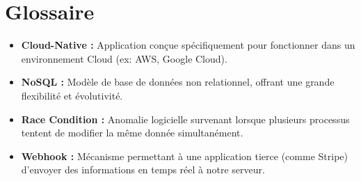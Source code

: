 \chapter*{Glossaire}
\begin{itemize}
    \item \textbf{Cloud-Native :} Application conçue spécifiquement pour fonctionner dans un environnement Cloud (ex: AWS, Google Cloud).
    \item \textbf{NoSQL :} Modèle de base de données non relationnel, offrant une grande flexibilité et évolutivité.
    \item \textbf{Race Condition :} Anomalie logicielle survenant lorsque plusieurs processus tentent de modifier la même donnée simultanément.
    \item \textbf{Webhook :} Mécanisme permettant à une application tierce (comme Stripe) d'envoyer des informations en temps réel à notre serveur.
\end{itemize}

\tableofcontents
\listoffigures
\listoftables
\newpage
